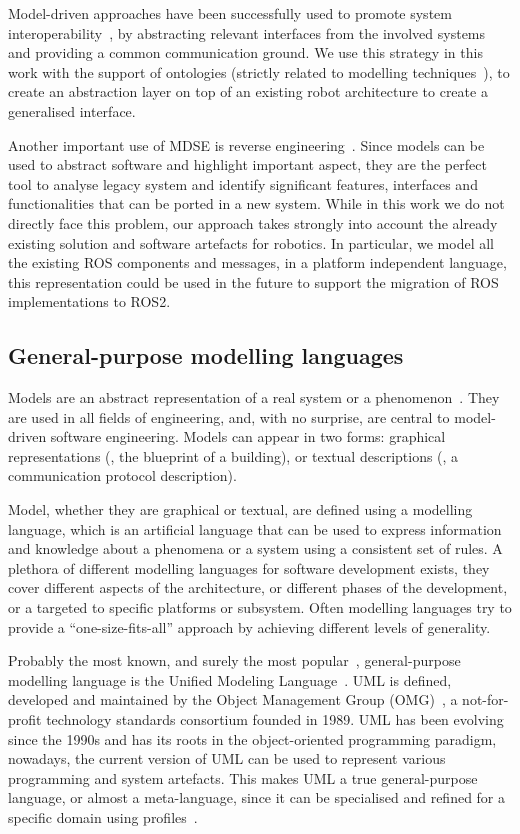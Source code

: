 Model-driven approaches have been successfully used to promote system interoperability~\cite{chungoora2013model}, by abstracting relevant interfaces from the involved systems and providing a common communication ground. We use this strategy in this work with the support of ontologies (strictly related to modelling techniques~\cite{guizzardi2007ontology}), to create an abstraction layer on top of an existing robot architecture to create a generalised interface.

Another important use of MDSE is reverse engineering~\cite{bruneliere2010modisco, rugaber2004model}. Since models can be used to abstract software and highlight important aspect, they are the perfect tool to analyse legacy system and identify significant features, interfaces and functionalities that can be ported in a new system. While in this work we do not directly face this problem, our approach takes strongly into account the already existing solution and software artefacts for robotics. In particular, we model all the existing ROS components and messages, in a platform independent language, this representation could be used in the future to support the migration of ROS implementations to ROS2.
 
\subsection{General-purpose modelling languages}
Models are an abstract representation of a real system or a phenomenon~\cite{schichl2004models}. They are used in all fields of engineering, and, with no surprise, are central to model-driven software engineering. Models can appear in two forms: graphical representations (\eg, the blueprint of a building), or textual descriptions (\eg, a communication protocol description). 

Model, whether they are graphical or textual, are defined using a modelling language, which is an artificial language that can be used to express information and knowledge about a phenomena or a system using a consistent set of rules. A plethora of different modelling languages for software development exists, they cover different aspects of the architecture, or different phases of the development, or a targeted to specific platforms or subsystem. Often modelling languages try to provide a ``one-size-fits-all'' approach by achieving different levels of generality.

Probably the most known, and surely the most popular~\cite{malavolta2012industry}, general-purpose modelling language is the Unified Modeling Language~\cite{rumbaugh2004unified}. UML is defined, developed and maintained by the Object Management Group (OMG)~\cite{omg}, a not-for-profit technology standards consortium founded in 1989. UML has been evolving since the 1990s and has its roots in the object-oriented programming paradigm, nowadays, the current version of UML can be used to represent various programming and system artefacts. This makes UML a true general-purpose language, or almost a meta-language, since it can be specialised and refined for a specific domain using profiles~\cite{fuentes2004introduction}. 

